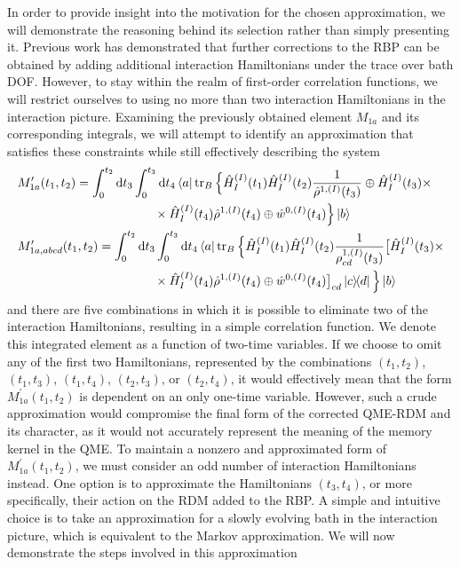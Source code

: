In order to provide insight into the motivation for the chosen approximation, we will demonstrate the reasoning behind its selection rather than simply presenting it. Previous work has demonstrated that further corrections to the RBP can be obtained by adding additional interaction Hamiltonians under the trace over bath DOF. However, to stay within the realm of first-order correlation functions, we will restrict ourselves to using no more than two interaction Hamiltonians in the interaction picture. Examining the previously obtained element $M_{1a}$ and its corresponding integrals, we will attempt to identify an approximation that satisfies these constraints while still effectively describing the system
\begin{equation}
    \begin{aligned}
    &M_{1a}^\prime(t_1, t_2) = \int_{0}^{t_2} \mathrm{d} t_3 \int_{0}^{t_3} \mathrm{d} t_4 \bra{a}\operatorname{tr}_B \Big\{ \hat{H}_{I}^{(I)}(t_1) \hat{H}_{I}^{(I)}(t_2) \frac{1}{\hat{\rho}^{1, (I)}(t_3)} \oplus \hat{H}_{I}^{(I)}(t_3) \times \\
    & \quad \quad \quad \quad \quad \quad \quad \quad \quad \quad \quad  \times\hat{H}_{I}^{(I)}(t_4) \hat{\rho}^{1, (I)}(t_4) \oplus \hat{w}^{0, (I)}(t_4)\Big\} \ket{b} \\
    &M_{1a,abcd}^\prime(t_1, t_2) = \int_{0}^{t_2} \mathrm{d} t_3 \int_{0}^{t_3} \mathrm{d} t_4 \bra{a}\operatorname{tr}_B \Big\{ \hat{H}_{I}^{(I)}(t_1) \hat{H}_{I}^{(I)}(t_2) \frac{1}{\rho_{cd}^{1, (I)}(t_3)}\big[\hat{H}_{I}^{(I)}(t_3) \times \\
    & \quad \quad \quad \quad \quad \quad \quad \quad \quad \quad \quad  \times\hat{H}_{I}^{(I)}(t_4) \hat{\rho}^{1, (I)}(t_4) \oplus \hat{w}^{0, (I)}(t_4)\big]_{cd} \ketbra{c}{d}\Big\} \ket{b} \\
    \end{aligned} 
\end{equation}
and there are five combinations in which it is possible to eliminate two of the interaction Hamiltonians, resulting in a simple correlation function. We denote this integrated element as a function of two-time variables. If we choose to omit any of the first two Hamiltonians, represented by the combinations $(t_1, t_2)$, $(t_1, t_3)$, $(t_1, t_4)$, $(t_2, t_3)$, or $(t_2, t_4)$, it would effectively mean that the form $M_{1a}^\prime(t_1, t_2)$ is dependent on an only one-time variable. However, such a crude approximation would compromise the final form of the corrected QME-RDM and its character, as it would not accurately represent the meaning of the memory kernel in the QME. To maintain a nonzero and approximated form of $M_{1a}^\prime(t_1, t_2)$, we must consider an odd number of interaction Hamiltonians instead. One option is to approximate the Hamiltonians $(t_3, t_4)$, or more specifically, their action on the RDM added to the RBP. A simple and intuitive choice is to take an approximation for a slowly evolving bath in the interaction picture, which is equivalent to the Markov approximation. We will now demonstrate the steps involved in this approximation
